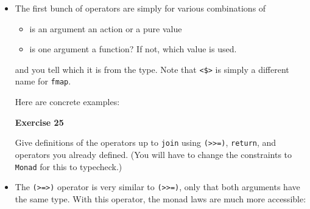 \documentclass[11pt,
  american,
  DIV13]{article}
\newenvironment{Shaded}{}{}
\newcommand{\CommentTok}[1]{\textcolor[rgb]{0.38,0.63,0.69}{\textit{#1}}}
\newcommand{\DataTypeTok}[1]{\textcolor[rgb]{0.56,0.13,0.00}{#1}}
\newcommand{\FunctionTok}[1]{\textcolor[rgb]{0.02,0.16,0.49}{#1}}
\newcommand{\NormalTok}[1]{#1}
\newcommand{\OperatorTok}[1]{\textcolor[rgb]{0.40,0.40,0.40}{#1}}
\newcommand{\OtherTok}[1]{\textcolor[rgb]{0.00,0.44,0.13}{#1}}
\newcommand{\StringTok}[1]{\textcolor[rgb]{0.25,0.44,0.63}{#1}}
\providecommand{\tightlist}{%
  \setlength{\itemsep}{0pt}\setlength{\parskip}{0pt}}
\begin{document}
\begin{itemize}
\item
  The first bunch of operators are simply for various combinations of

  \begin{itemize}
  \tightlist
  \item
    is an argument an action or a pure value
  \item
    is one argument a function? If not, which value is used.
  \end{itemize}

  and you tell which it is from the type. Note that
  \texttt{\textless{}\$\textgreater{}} is simply a different name for
  \texttt{fmap}.

  Here are concrete examples:

\begin{Shaded}
\end{Shaded}

  \textbf{Exercise 25}

  Give definitions of the operators up to \texttt{join} using
  \texttt{(\textgreater{}\textgreater{}=)}, \texttt{return}, and
  operators you already defined. (You will have to change the
  constraints to \texttt{Monad} for this to typecheck.)
\item
  The \texttt{(\textgreater{}=\textgreater{})} operator is very similar
  to \texttt{(\textgreater{}\textgreater{}=)}, only that both arguments
  have the same type. With this operator, the monad laws are much more
  accessible:


\end{itemize}
\end{document}

